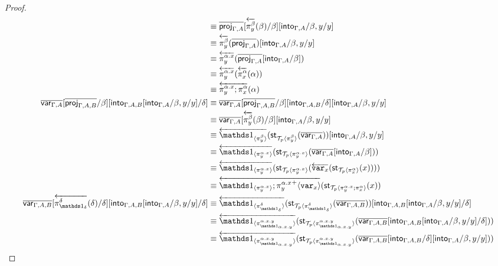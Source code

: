 \documentclass[10pt]{article}
\theoremstyle{definition}
\newcommand{\rewrite}[2]{\overleftarrow{#1}(#2)}
\newcommand\StI[2]{\ensuremath{\mathsf{st}_{#1}(#2)}}
\newcommand\ApEl[2]{\mathcal{T}_{#1}\langle#2\rangle}
\newcommand\ApPlus[2]{\ensuremath{{#1}^+ \langle #2 \rangle }}
\begin{document}
\begin{proof}
\begin{align*}
&\equiv \upstairs{\proj{\Gamma, A}}[\rewrite{\pi^\beta_y}{\beta}/\beta][\into{\Gamma, A}/\beta, y/y] \\
&\equiv \rewrite{\pi^\beta_y}{\upstairs{\proj{\Gamma, A}}}[\into{\Gamma, A}/\beta, y/y] \\
&\equiv \rewrite{\pi^{\alpha.x}_y}{\upstairs{\proj{\Gamma, A}}[\into{\Gamma, A}/\beta]} \\
&\equiv \rewrite{\pi^{\alpha.x}_y}{\rewrite{\pi^\alpha_x}{\alpha}} \\
&\equiv \rewrite{\pi^{\alpha.x}_y;\pi^\alpha_x}{\alpha} \\
\upstairs{\qvar{\Gamma, A}}[\upstairs{\proj{\Gamma, A, B}}/\beta][\into{\Gamma, A, B}[\into{\Gamma, A}/\beta, y/y]/\delta]
&\equiv \upstairs{\qvar{\Gamma, A}}[\upstairs{\proj{\Gamma, A, B}}/\beta][\into{\Gamma, A, B}/\delta][\into{\Gamma, A}/\beta, y/y] \\
&\equiv \upstairs{\qvar{\Gamma, A}}[\rewrite{\pi^\beta_y}{\beta}/\beta][\into{\Gamma, A}/\beta, y/y] \\
&\equiv \rewrite{\ApOne{\pi^\beta_y}}{\StI{\ApEl{p}{\pi^\beta_y}}{\upstairs{\qvar{\Gamma, A}}}}[\into{\Gamma, A}/\beta, y/y] \\
&\equiv \rewrite{\ApOne{\pi^{\alpha.x}_y}}{\StI{\ApEl{p}{\pi^{\alpha.x}_y}}{\upstairs{\qvar{\Gamma, A}}[\into{\Gamma, A}/\beta]}} \\
&\equiv \rewrite{\ApOne{\pi^{\alpha.x}_y}}{\StI{\ApEl{p}{\pi^{\alpha.x}_y}}{\rewrite{\var{x}}{\StI{\ApEl{p}{\pi^{\alpha}_x}}{x}}}} \\
&\equiv \rewrite{\ApOne{\pi^{\alpha.x}_y};\ApPlus{\pi^{\alpha.x}_y}{\var{x}}}{\StI{\ApEl{p}{\pi^{\alpha.x}_y;\pi^{\alpha}_x}}{x}} \\
\upstairs{\qvar{\Gamma, A, B}}[\rewrite{\pi^\delta_{\One_\delta}}{\delta}/\delta][\into{\Gamma, A, B}[\into{\Gamma, A}/\beta, y/y]/\delta]
&\equiv \rewrite{\ApOne{\pi^\delta_{\One_\delta}}}{\StI{\ApEl{p}{\pi^\delta_{\One_\delta}}}{\upstairs{\qvar{\Gamma, A, B}}}}[\into{\Gamma, A, B}[\into{\Gamma, A}/\beta, y/y]/\delta] \\
&\equiv \rewrite{\ApOne{\pi^{\alpha.x.y}_{\One_{\alpha.x.y}}}}{\StI{\ApEl{p}{\pi^{\alpha.x.y}_{\One_{\alpha.x.y}}}}{\upstairs{\qvar{\Gamma, A, B}}[\into{\Gamma, A, B}[\into{\Gamma, A}/\beta, y/y]/\delta]}} \\
&\equiv \rewrite{\ApOne{\pi^{\alpha.x.y}_{\One_{\alpha.x.y}}}}{\StI{\ApEl{p}{\pi^{\alpha.x.y}_{\One_{\alpha.x.y}}}}{\upstairs{\qvar{\Gamma, A, B}}[\into{\Gamma, A, B}/\delta][\into{\Gamma, A}/\beta, y/y]}} \\

\end{align*}
\end{proof}
\end{document}
